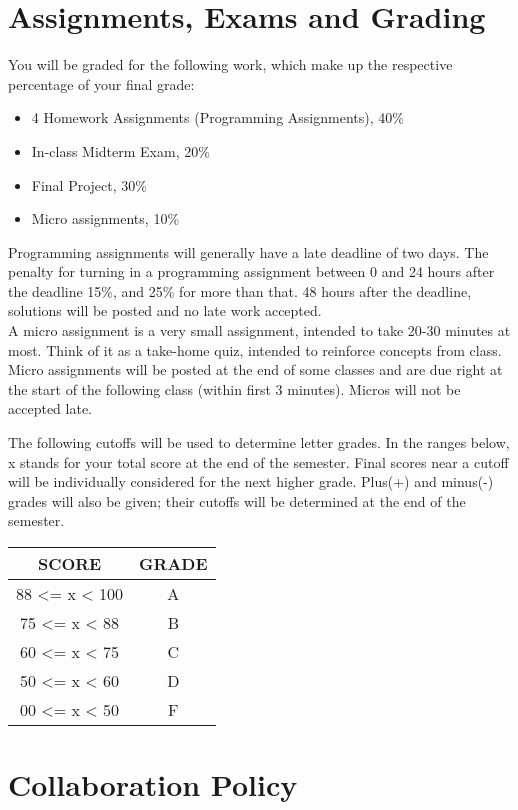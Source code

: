 \documentclass[10pt]{article}
\begin{document}
\section*{Assignments, Exams and Grading}

You will be graded for the following work, which make up the respective percentage of your final grade:
\begin{itemize}\itemsep-1pt
  \item 4 Homework Assignments (Programming Assignments), 40\%
  \item In-class Midterm Exam, 20\%
  \item Final Project, 30\%
  \item Micro assignments, 10\%
\end{itemize}
Programming assignments will generally have a late deadline of two days. The
penalty for turning in a programming assignment between 0 and 24 hours after
the deadline 15\%, and 25\% for more than that. 48 hours after the deadline,
solutions will be posted and no late work accepted.\\
A micro assignment is a very small assignment, intended to take 20-30 minutes
at most. Think of it as a take-home quiz, intended to reinforce concepts from
class. Micro assignments will be posted at the end of some classes and are due
right at the start of the following class (within first 3 minutes). Micros will
not be accepted late.

The following cutoffs will be used to determine letter grades. In the ranges
below, x stands for your total score at the end of the semester. Final scores
near a cutoff will be individually considered for the next higher grade.
Plus(+) and minus(-) grades will also be given; their cutoffs will be
determined at the end of the semester.
\begin{center}
  \begin{tabular}{c | c}
    SCORE & GRADE \\\hline
    88 <= x < 100 & A \\
    75 <= x < 88 & B \\
    60 <= x < 75 & C \\
    50 <= x < 60 & D \\
    00 <= x < 50 & F \\
  \end{tabular}
\end{center}


\section*{Collaboration Policy}
\end{document}
